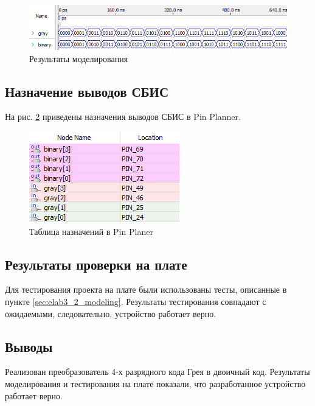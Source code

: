 \begin{figure}[H]
\begin{center}
	\includegraphics[width=\textwidth]{elab3_2_modeling}
	\caption{Результаты моделирования}
	\label{fig:elab3_2_modeling}
\end{center}
\end{figure}

\subsection{Назначение выводов СБИС}

На рис. \ref{fig:elab3_2_pins} приведены назначения выводов СБИС в Pin Planner.

\begin{figure}[H]
\begin{center}
	\includegraphics{elab3_2_pins}
	\caption{Таблица назначений в Pin Planer}
	\label{fig:elab3_2_pins}
\end{center}
\end{figure}

\subsection{Результаты проверки на плате}

Для тестирования проекта на плате были использованы тесты, описанные в пункте \ref{sec:elab3_2_modeling}. Результаты тестирования совпадают с ожидаемыми, следовательно, устройство работает верно.

\subsection{Выводы}

Реализован преобразователь 4-х разрядного кода Грея в двоичный код. Результаты моделирования и тестирования на плате показали, что разработанное устройство работает верно.

